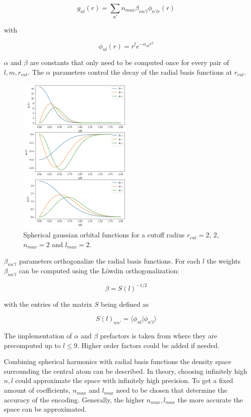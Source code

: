 $$g_{nl}(r) = \sum_{n'}{n_{max}} \beta_{nn'l} \phi_{n'lr}(r) $$

with 

$$\phi_{nl}(r) = r^l e^{-\alpha_{nl}r^2} $$ %



$\alpha$ and $\beta$ are constants that only need to be computed once for every pair of $l,m, r_{cut}$.
The $\alpha$ parameters control the decay of the radial basis functions at $r_{cut}$.

\begin{figure} [hb!]
  \centering
  \includegraphics[width=0.5\textwidth]{figures/snap/gaus_orb.png} %
  \caption[Radial basis functions]{Spherical gaussian orbital functions for a cutoff radius $r_{cut}=2$, $2$, $n_{max}=2$ and $l_{max}=2$. }
  \label{fig:gaussians}
\end{figure}

$\beta_{nn'l}$ parameters orthogonalize the radial basis functions.
For each $l$ the weights $\beta_{nn'l}$ can be computed using the Löwdin orthogonalization:

$$\beta = S(l)^{-1/2} $$

with the entries of the matrix $S$ being defined as

$$S(l)_{nn'} = \langle \phi_{nl} | \phi_{n'l} \rangle  $$

The implementation of $\alpha$ and $\beta$ prefactors is taken from \cite{dscribe} where they are precomputed up to $l \leq 9$.
Higher order factors could be added if needed.


Combining spherical harmonics with radial basis functions the density space surrounding the central atom can be described.
In theory, choosing infinitely high $n, l$ could approximate the space with infinitely high precision.
To get a fixed amount of coefficients, $n_{max}$ and $l_{max}$ need to be chosen that determine the
accuracy of the encoding.
Generally, the higher $n_{max}, l_{max}$ the more accurate the space can be approximated.

